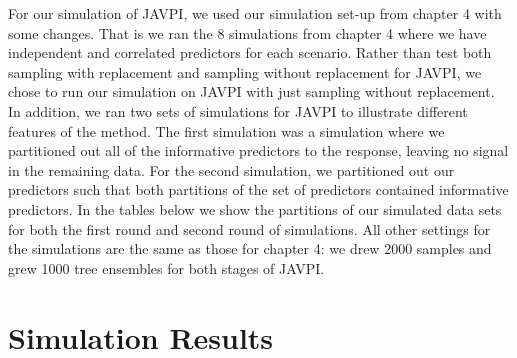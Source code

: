 \documentclass[12pt,twoside]{reedthesis}
\theoremstyle{definition}
\theoremstyle{definition}
\theoremstyle{definition}
\theoremstyle{remark}
\begin{document}
For our simulation of JAVPI, we used our simulation set-up from chapter
4 with some changes. That is we ran the 8 simulations from chapter 4
where we have independent and correlated predictors for each scenario.
Rather than test both sampling with replacement and sampling without
replacement for JAVPI, we chose to run our simulation on JAVPI with just
sampling without replacement. In addition, we ran two sets of
simulations for JAVPI to illustrate different features of the method.
The first simulation was a simulation where we partitioned out all of
the informative predictors to the response, leaving no signal in the
remaining data. For the second simulation, we partitioned out our
predictors such that both partitions of the set of predictors contained
informative predictors. In the tables below we show the partitions of
our simulated data sets for both the first round and second round of
simulations. All other settings for the simulations are the same as
those for chapter 4: we drew 2000 samples and grew 1000 tree ensembles
for both stages of JAVPI. \par 
\begin{table}

\caption{\label{tab:unnamed-chunk-16}Partitions for Simulation Runs 1 and 2, respectively}
\centering
{}
\end{table}
\section{Simulation Results}\label{simulation-results-1}
\end{document}
